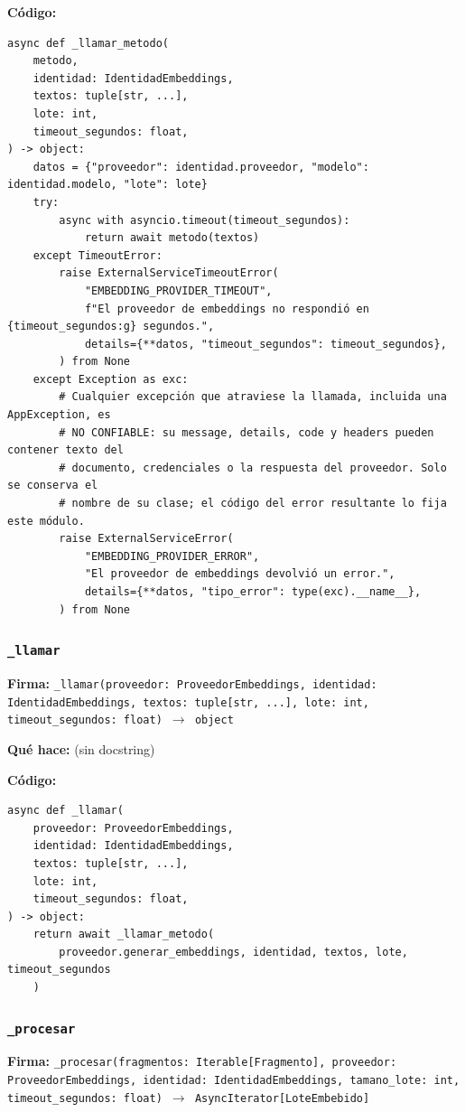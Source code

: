 \documentclass[11pt,a4paper]{article}
\begin{document}
\textbf{Código:}
\begin{lstlisting}
async def _llamar_metodo(
    metodo,
    identidad: IdentidadEmbeddings,
    textos: tuple[str, ...],
    lote: int,
    timeout_segundos: float,
) -> object:
    datos = {"proveedor": identidad.proveedor, "modelo": identidad.modelo, "lote": lote}
    try:
        async with asyncio.timeout(timeout_segundos):
            return await metodo(textos)
    except TimeoutError:
        raise ExternalServiceTimeoutError(
            "EMBEDDING_PROVIDER_TIMEOUT",
            f"El proveedor de embeddings no respondió en {timeout_segundos:g} segundos.",
            details={**datos, "timeout_segundos": timeout_segundos},
        ) from None
    except Exception as exc:
        # Cualquier excepción que atraviese la llamada, incluida una AppException, es
        # NO CONFIABLE: su message, details, code y headers pueden contener texto del
        # documento, credenciales o la respuesta del proveedor. Solo se conserva el
        # nombre de su clase; el código del error resultante lo fija este módulo.
        raise ExternalServiceError(
            "EMBEDDING_PROVIDER_ERROR",
            "El proveedor de embeddings devolvió un error.",
            details={**datos, "tipo_error": type(exc).__name__},
        ) from None
\end{lstlisting}

\subsubsection*{\texttt{\_llamar}}
\textbf{Firma:} \texttt{\_llamar(proveedor: ProveedorEmbeddings, identidad: IdentidadEmbeddings, textos: tuple[str, ...], lote: int, timeout\_segundos: float) $\rightarrow$ object}

\textbf{Qué hace:} (sin docstring)

\textbf{Código:}
\begin{lstlisting}
async def _llamar(
    proveedor: ProveedorEmbeddings,
    identidad: IdentidadEmbeddings,
    textos: tuple[str, ...],
    lote: int,
    timeout_segundos: float,
) -> object:
    return await _llamar_metodo(
        proveedor.generar_embeddings, identidad, textos, lote, timeout_segundos
    )
\end{lstlisting}

\subsubsection*{\texttt{\_procesar}}
\textbf{Firma:} \texttt{\_procesar(fragmentos: Iterable[Fragmento], proveedor: ProveedorEmbeddings, identidad: IdentidadEmbeddings, tamano\_lote: int, timeout\_segundos: float) $\rightarrow$ AsyncIterator[LoteEmbebido]}
\end{document}
